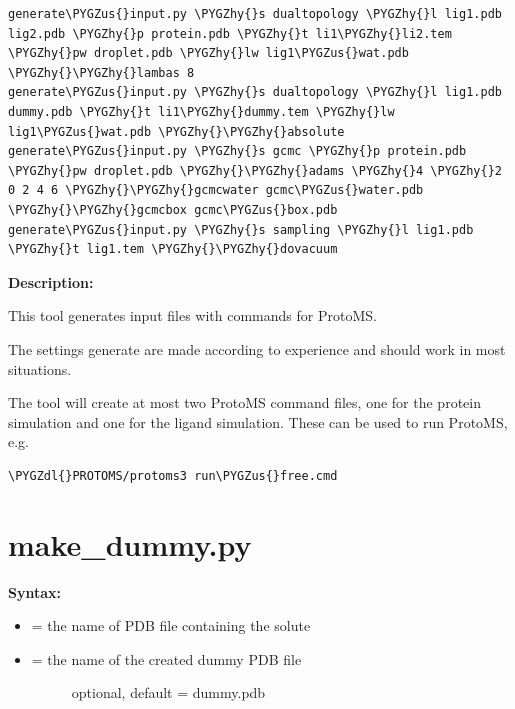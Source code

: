 \documentclass[letterpaper,10pt,english]{sphinxmanual}
\def\PYGZus{\char`\_}
\def\PYGZdl{\char`\$}
\def\PYGZhy{\char`\-}
\begin{document}
\begin{Verbatim}[frame=single,commandchars=\\\{\}]
generate\PYGZus{}input.py \PYGZhy{}s dualtopology \PYGZhy{}l lig1.pdb lig2.pdb \PYGZhy{}p protein.pdb \PYGZhy{}t li1\PYGZhy{}li2.tem \PYGZhy{}pw droplet.pdb \PYGZhy{}lw lig1\PYGZus{}wat.pdb \PYGZhy{}\PYGZhy{}lambas 8
generate\PYGZus{}input.py \PYGZhy{}s dualtopology \PYGZhy{}l lig1.pdb dummy.pdb \PYGZhy{}t li1\PYGZhy{}dummy.tem \PYGZhy{}lw lig1\PYGZus{}wat.pdb \PYGZhy{}\PYGZhy{}absolute
generate\PYGZus{}input.py \PYGZhy{}s gcmc \PYGZhy{}p protein.pdb \PYGZhy{}pw droplet.pdb \PYGZhy{}\PYGZhy{}adams \PYGZhy{}4 \PYGZhy{}2 0 2 4 6 \PYGZhy{}\PYGZhy{}gcmcwater gcmc\PYGZus{}water.pdb \PYGZhy{}\PYGZhy{}gcmcbox gcmc\PYGZus{}box.pdb
generate\PYGZus{}input.py \PYGZhy{}s sampling \PYGZhy{}l lig1.pdb \PYGZhy{}t lig1.tem \PYGZhy{}\PYGZhy{}dovacuum
\end{Verbatim}

\textbf{Description:}

This tool generates input files with commands for ProtoMS.

The settings generate are made according to experience and should work in most situations.

The tool will create at most two ProtoMS command files, one for the protein simulation and one for the ligand simulation. These can be used to run ProtoMS, e.g.

\begin{Verbatim}[frame=single,commandchars=\\\{\}]
\PYGZdl{}PROTOMS/protoms3 run\PYGZus{}free.cmd
\end{Verbatim}


\section{make\_dummy.py}
\label{tools:make-dummy-py}
\textbf{Syntax:}

\begin{itemize}
\item {} 
 = the name of PDB file containing the solute

\item {} \begin{description}
\item[{ = the name of the created dummy PDB file}] \leavevmode
optional, default = dummy.pdb

\end{description}

\end{itemize}
\end{document}
